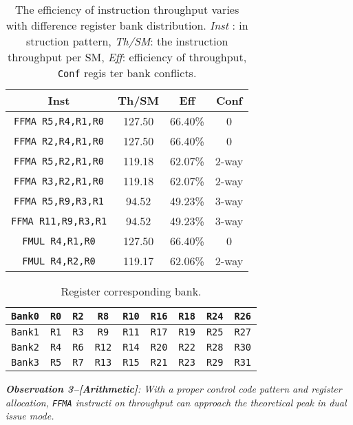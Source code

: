 \begin{table}[htbp]
    \caption{The efficiency of instruction throughput varies with difference register bank distribution. {\it Inst} : in
struction pattern, {\it Th/SM}: the instruction throughput per SM, {\it Eff}: efficiency of throughput, {\tt Conf} regis
ter bank conflicts.}
\centering
\scalebox{1.0} {
\begin{tabular}{|c|c|c|c|}
\hline
Inst &Th/SM&Eff&Conf\\
\hline
{\tt FFMA R5,R4,R1,R0}&127.50&66.40\%&0\\
\hline
{\tt FFMA R2,R4,R1,R0}&127.50&66.40\%&0\\
\hline
{\tt FFMA R5,R2,R1,R0}&119.18&62.07\%&2-way\\
\hline
{\tt FFMA R3,R2,R1,R0}&119.18&62.07\%&2-way\\
\hline
{\tt FFMA R5,R9,R3,R1}&94.52&49.23\%&3-way\\
\hline
{\tt FFMA R11,R9,R3,R1}&94.52&49.23\%&3-way\\
\hline
{\tt FMUL R4,R1,R0}&127.50&66.40\%&0\\
\hline
{\tt FMUL R4,R2,R0}&119.17&62.06\%&2-way\\
\hline
\end{tabular}
}
\label{tab:th}
\end{table}


\begin{table}[htbp]
\caption{Register corresponding bank.}
\centering
\scalebox{1.0} {
\begin{tabular}{|c|c|c|c|c|c|c|c|c|}
\hline
    {\tt Bank0}&{\tt R0}&{\tt R2}&{\tt R8}&{\tt R10}&{\tt R16}&{\tt R18}&{\tt R24}&{\tt R26}\\
\hline
    {\tt Bank1}&{\tt R1}&{\tt R3}&{\tt R9}&{\tt R11}&{\tt R17}&{\tt R19}&{\tt R25}&{\tt R27} \\
\hline
    {\tt Bank2}&{\tt R4}&{\tt R6}&{\tt R12}&{\tt R14}&{\tt R20}&{\tt R22}&{\tt R28}&{\tt R30}\\
\hline
    {\tt Bank3}&{\tt R5}&{\tt R7}&{\tt R13}&{\tt R15}&{\tt R21}&{\tt R23}&{\tt R29}&{\tt R31}\\
\hline
\end{tabular}
}
\label{tab:reg}
\end{table}

{\em {\bf Observation 3--[Arithmetic]}: With a proper control code pattern and register allocation, {\tt FFMA} instructi
on throughput can approach the theoretical peak in dual issue mode.}

